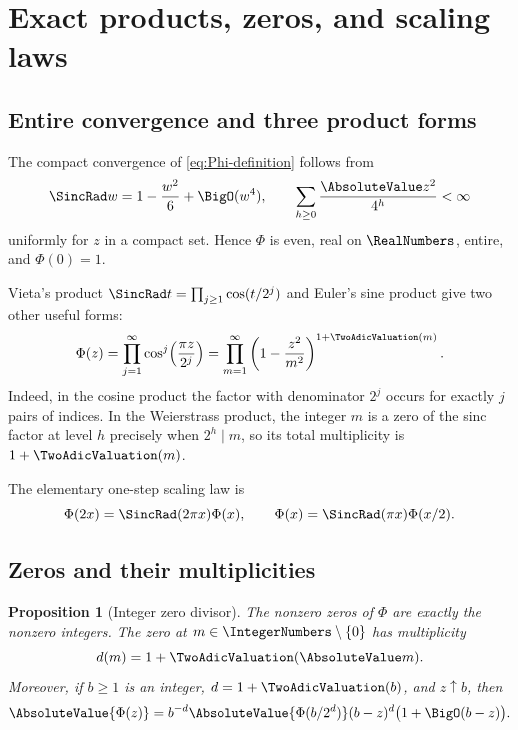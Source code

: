 \documentclass[11pt,oneside]{article}
\newtheorem{proposition}[theorem]{Proposition}
\theoremstyle{definition}
\theoremstyle{remark}
\newcommand{\Phiup}{\Phi}
\begin{document}
\section{Exact products, zeros, and scaling laws}
\label{sec:exact-products}

\subsection{Entire convergence and three product forms}

The compact convergence of \eqref{eq:Phi-definition} follows from
\[
 \SincRad w=1-\frac{w^2}{6}+\BigO(w^4),
 \qquad
 \sum_{h\ge0}\frac{\AbsoluteValue z^2}{4^h}<\infty
\]
uniformly for $z$ in a compact set.  Hence $\Phiup$ is even, real on $\RealNumbers$, entire, and
$\Phiup(0)=1$.

Vieta's product $\SincRad t=\prod_{j\ge1}\cos(t/2^j)$ and Euler's sine product give two other
useful forms:
\begin{equation}
 \Phiup(z)
 =\prod_{j=1}^{\infty}\cos^j\!\left(\frac{\pi z}{2^j}\right)
 =\prod_{m=1}^{\infty}
   \left(1-\frac{z^2}{m^2}\right)^{1+\TwoAdicValuation(m)}.
 \label{eq:three-products}
\end{equation}
Indeed, in the cosine product the factor with denominator $2^j$ occurs for exactly $j$
pairs of indices.  In the Weierstrass product, the integer $m$ is a zero of the sinc factor
at level $h$ precisely when $2^h\mid m$, so its total multiplicity is $1+\TwoAdicValuation(m)$.

The elementary one-step scaling law is
\begin{equation}
 \Phiup(2x)=\SincRad(2\pi x)\Phiup(x),
 \qquad
 \Phiup(x)=\SincRad(\pi x)\Phiup(x/2).
 \label{eq:one-step-scaling}
\end{equation}

\subsection{Zeros and their multiplicities}

\begin{proposition}[Integer zero divisor]
\label{prop:zero-divisor}
The nonzero zeros of $\Phiup$ are exactly the nonzero integers.  The zero at
$m\in\IntegerNumbers\setminus\{0\}$ has multiplicity
\[
 d(m)=1+\TwoAdicValuation(\AbsoluteValue m).
\]
Moreover, if $b\ge1$ is an integer, $d=1+\TwoAdicValuation(b)$, and $z\uparrow b$, then
\begin{equation}
 \AbsoluteValue{\Phiup(z)}
 =b^{-d}\AbsoluteValue{\Phiup(b/2^d)}(b-z)^d\bigl(1+\BigO(b-z)\bigr).
 \label{eq:zero-local-coefficient}
\end{equation}
\end{proposition}
\end{document}
